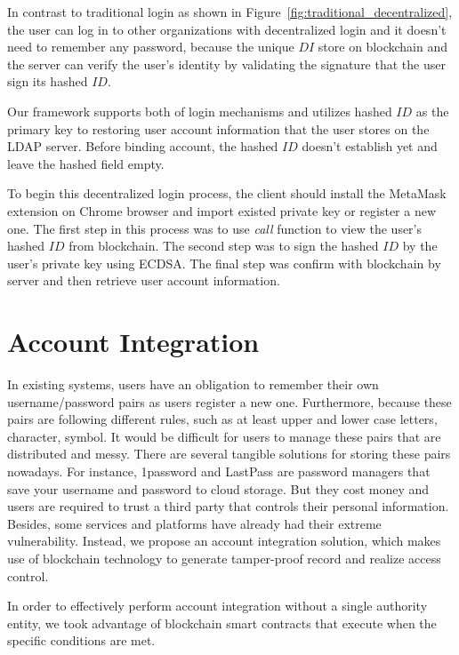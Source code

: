In contrast to traditional login as shown in Figure~\ref{fig:traditional_decentralized}, the user can log in to other organizations with decentralized login and it doesn't need to remember any password, because the unique \(DI\) store on blockchain and the server can verify the user's identity by validating the signature that the user sign its hashed \(ID\).\par
Our framework supports both of login mechanisms and utilizes hashed \(ID\) as the primary key to restoring user account information that the user stores on the LDAP server. Before binding account, the hashed \(ID\) doesn't establish yet and leave the hashed field empty.\par 
To begin this decentralized login process, the client should install the MetaMask extension on Chrome browser and import existed private key or register a new one. The first step in this process was to use \textit{call} function to view the user's hashed \(ID\) from blockchain. The second step was to sign the hashed \(ID\) by the user's private key using ECDSA. The final step was confirm with blockchain by server and then retrieve user account information.

\newpage
\section{Account Integration}
In existing systems, users have an obligation to remember their own username/password pairs as users register a new one. Furthermore, because these pairs are following different rules, such as at least upper and lower case letters, character, symbol. It would be difficult for users to manage these pairs that are distributed and messy. There are several tangible solutions for storing these pairs nowadays. For instance, 1password and LastPass are password managers that save your username and password to cloud storage. But they cost money and users are required to trust a third party that controls their personal information. Besides, some services and platforms have already had their extreme vulnerability. Instead, we propose an account integration solution, which makes use of blockchain technology to generate tamper-proof record and realize access control.\par 
In order to effectively perform account integration without a single authority entity, we took advantage of blockchain smart contracts that execute when the specific conditions are met.

\renewcommand\labelenumi{(\theenumi)}

